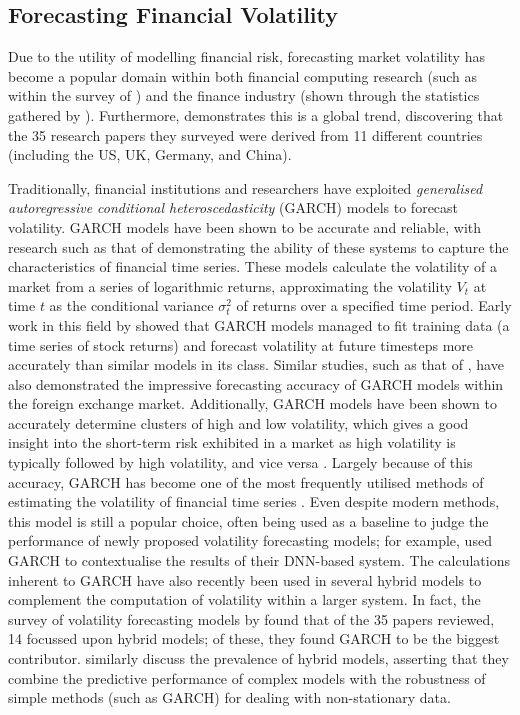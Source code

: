 \documentclass[a4paper, 11pt]{report}
\begin{document}
    \subsection{Forecasting Financial Volatility}

    Due to the utility of modelling financial risk, forecasting market volatility has become a popular domain within both financial computing research (such as within the survey of \citet{ozbayoglu-2020}) and the finance industry (shown through the statistics gathered by \citet{chartis-2019}). Furthermore, \citet{ge-2022} demonstrates this is a global trend, discovering that the 35 research papers they surveyed were derived from 11 different countries (including the US, UK, Germany, and China).

    Traditionally, financial institutions and researchers have exploited \emph{generalised autoregressive conditional heteroscedasticity} (GARCH) models to forecast volatility. GARCH models have been shown to be accurate and reliable, with research such as that of \citet{lahmiri-2017} demonstrating the ability of these systems to capture the characteristics of financial time series. These models calculate the volatility of a market from a series of logarithmic returns, approximating the volatility $V_t$ at time $t$ as the conditional variance $\sigma_{t}^2$ of returns over a specified time period. Early work in this field by \citet{akgiray-1989} showed that GARCH models managed to fit training data (a time series of stock returns) and forecast volatility at future timesteps more accurately than similar models in its class. Similar studies, such as that of \citet{hansen-2005}, have also demonstrated the impressive forecasting accuracy of GARCH models within the foreign exchange market. Additionally, GARCH models have been shown to accurately determine clusters of high and low volatility, which gives a good insight into the short-term risk exhibited in a market as high volatility is typically followed by high volatility, and vice versa \citep{arum-2019}. Largely because of this accuracy, GARCH has become one of the most frequently utilised methods of estimating the volatility of financial time series \citep{cheng-2003}. Even despite modern methods, this model is still a popular choice, often being used as a baseline to judge the performance of newly proposed volatility forecasting models; for example, \citet{rodikov-2022} used GARCH to contextualise the results of their DNN-based system. The calculations inherent to GARCH have also recently been used in several hybrid models to complement the computation of volatility within a larger system. In fact, the survey of volatility forecasting models by \citet{ge-2022} found that of the 35 papers reviewed, 14 focussed upon hybrid models; of these, they found GARCH to be the biggest contributor. \citet{tino-2001} similarly discuss the prevalence of hybrid models, asserting that they combine the predictive performance of complex models with the robustness of simple methods (such as GARCH) for dealing with non-stationary data.
\end{document}
